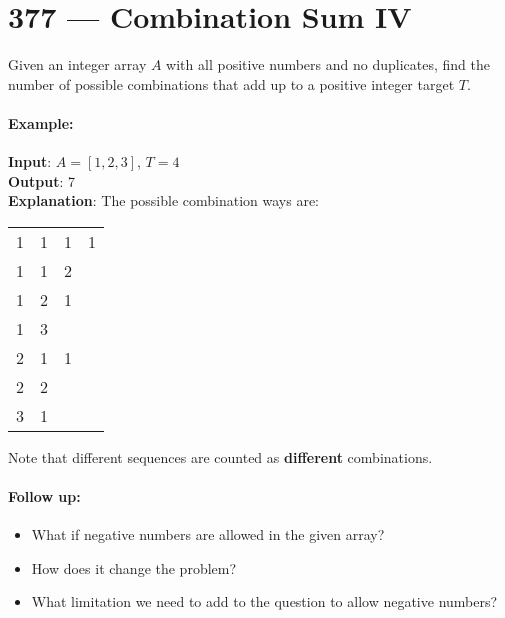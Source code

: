 \section{377 --- Combination Sum IV}
Given an integer array $A$ with all positive numbers and no duplicates, find the number of possible combinations that add up to a positive integer target $T$.

\paragraph{Example:}

\begin{flushleft}
\textbf{Input}: $A = [1, 2, 3]$, $T = 4$
\\
\textbf{Output}: 7
\\
\textbf{Explanation}: The possible combination ways are:
\begin{table}[H]
\begin{tabular}{llll}
1 & 1 & 1 & 1\\
1 & 1 & 2 & \\
1 & 2 & 1  & \\
1 & 3  &  & \\
2 & 1 & 1 & \\
2 & 2 &  & \\
3 & 1 &  & 
\end{tabular}
\end{table}
Note that different sequences are counted as \textbf{different} combinations.
\end{flushleft}

 

\paragraph{Follow up:}
\begin{itemize}
\item What if negative numbers are allowed in the given array?
\item How does it change the problem?
\item What limitation we need to add to the question to allow negative numbers?
\end{itemize}